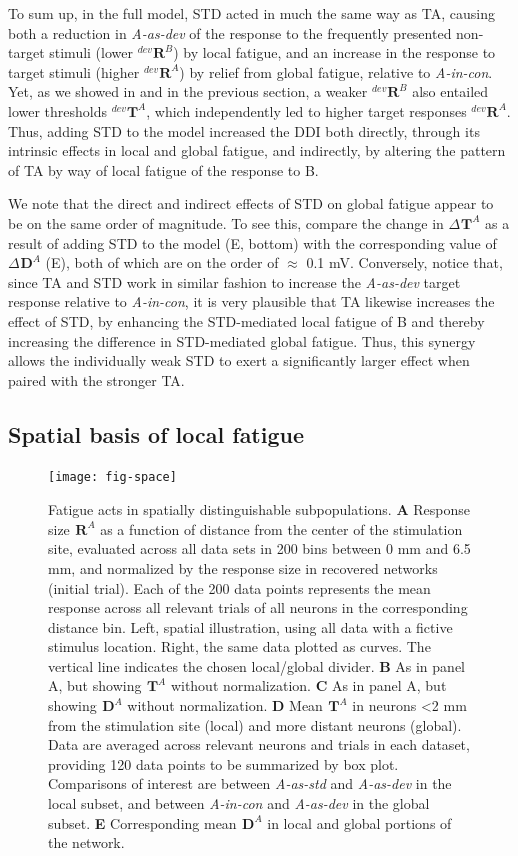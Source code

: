 \documentclass[9pt,lineno,onehalfspacing]{elife}
\newcommand{\dev}{\textit{A-as-dev}}
\newcommand{\msc}{\textit{A-in-con}}
\newcommand{\std}{\textit{A-as-std}}
\newcommand{\R}[3][]{{}^{#1}_{}\boldsymbol R^{#2}_{#3}}
\newcommand{\T}[3][]{{}^{#1}_{}\boldsymbol T^{#2}_{#3}}
\newcommand{\D}[3][]{{}^{#1}_{}\boldsymbol D^{#2}_{#3}}
\begin{document}
To sum up, in the full model, STD acted in much the same way as TA, causing both a reduction in \dev{} of the response to the frequently presented non-target stimuli (lower $\R[dev]{B}{}$) by local fatigue, and an increase in the response to target stimuli (higher $\R[dev]{A}{}$) by relief from global fatigue, relative to \msc{}. Yet, as we showed in  and in the previous section, a weaker $\R[dev]{B}{}$ also entailed lower thresholds $\T[dev]{A}{}$, which independently led to higher target responses $\R[dev]{A}{}$. Thus, adding STD to the model increased the DDI both directly, through its intrinsic effects in local and global fatigue, and indirectly, by altering the pattern of TA by way of local fatigue of the response to B.

We note that the direct and indirect effects of STD on global fatigue appear to be on the same order of magnitude. To see this, compare the change in $\Delta \T{A}{}$ as a result of adding STD to the model (E, bottom) with the corresponding value of $\Delta \D{A}{}$ (E), both of which are on the order of $\approx$ 0.1 mV. Conversely, notice that, since TA and STD work in similar fashion to increase the \dev{} target response relative to \msc{}, it is very plausible that TA likewise increases the effect of STD, by enhancing the STD-mediated local fatigue of B and thereby increasing the difference in STD-mediated global fatigue. Thus, this synergy allows the individually weak STD to exert a significantly larger effect when paired with the stronger TA.

\subsection{Spatial basis of local fatigue}

\begin{figure}
    \texttt{[image: fig-space]}
    \caption{%
        Fatigue acts in spatially distinguishable subpopulations.
        \textbf{A} Response size $\R{A}{}$ as a function of distance from the center of the stimulation site, evaluated across all data sets in 200 bins between 0 mm and 6.5 mm, and normalized by the response size in recovered networks (initial trial). Each of the 200 data points represents the mean response across all relevant trials of all neurons in the corresponding distance bin. Left, spatial illustration, using all data with a fictive stimulus location. Right, the same data plotted as curves. The vertical line indicates the chosen local/global divider.
        \textbf{B} As in panel A, but showing $\T{A}{}$ without normalization.
        \textbf{C} As in panel A, but showing $\D{A}{}$ without normalization.
        \textbf{D} Mean $\T{A}{}$ in neurons <2 mm from the stimulation site (local) and more distant neurons (global). Data are averaged across relevant neurons and trials in each dataset, providing 120 data points to be summarized by box plot. Comparisons of interest are between \std{} and \dev{} in the local subset, and between \msc{} and \dev{} in the global subset.
        \textbf{E} Corresponding mean $\D{A}{}$ in local and global portions of the network.
    }
    \label{fig:space}
\end{figure}
\end{document}
